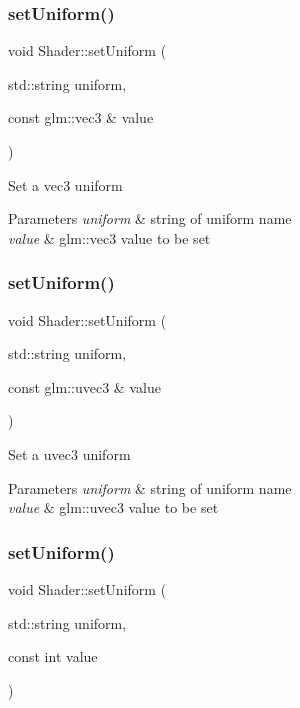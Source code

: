 \subsubsection{\texorpdfstring{setUniform()}{setUniform()}\hspace{0.1cm}{\footnotesize\ttfamily [1/10]}}
{\footnotesize\ttfamily void Shader\+::set\+Uniform (\begin{DoxyParamCaption}\item[{std\+::string}]{uniform,  }\item[{const glm\+::vec3 \&}]{value }\end{DoxyParamCaption})}

Set a vec3 uniform


\begin{DoxyParams}{Parameters}
{\em uniform} & string of uniform name \\
\hline
{\em value} & glm\+::vec3 value to be set \\
\hline
\end{DoxyParams}
\mbox{\label{class_shader_a067b36bf8725bb293d710fc238a25810}} 
\subsubsection{\texorpdfstring{setUniform()}{setUniform()}\hspace{0.1cm}{\footnotesize\ttfamily [2/10]}}
{\footnotesize\ttfamily void Shader\+::set\+Uniform (\begin{DoxyParamCaption}\item[{std\+::string}]{uniform,  }\item[{const glm\+::uvec3 \&}]{value }\end{DoxyParamCaption})}

Set a uvec3 uniform


\begin{DoxyParams}{Parameters}
{\em uniform} & string of uniform name \\
\hline
{\em value} & glm\+::uvec3 value to be set \\
\hline
\end{DoxyParams}
\mbox{\label{class_shader_aafe91198ce854c8aa597634c2aade5b1}} 
\subsubsection{\texorpdfstring{setUniform()}{setUniform()}\hspace{0.1cm}{\footnotesize\ttfamily [3/10]}}
{\footnotesize\ttfamily void Shader\+::set\+Uniform (\begin{DoxyParamCaption}\item[{std\+::string}]{uniform,  }\item[{const int}]{value }\end{DoxyParamCaption})}

